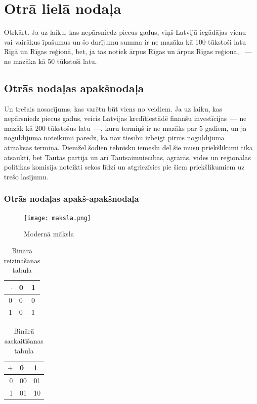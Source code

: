 \documentclass{LU-nosleguma}
\begin{document}
\section{Otrā lielā nodaļa}
Otrkārt. Ja uz laiku, kas nepārsniedz piecus gadus, viņš Latvijā iegādājas vienu vai vairākus īpašumus un šo darījumu
summa ir ne mazāka kā 100 tūkstoši latu Rīgā un Rīgas reģionā, bet, ja tas notiek ārpus Rīgas un ārpus Rīgas reģiona,
~--- ne mazāka kā 50 tūkstoši latu.

\subsection{Otrās nodaļas apakšnodaļa}
Un trešais nosacījums, kas varētu būt viens no veidiem. Ja uz laiku, kas nepārsniedz piecus gadus, veicis Latvijas 
kredītiestādē finanšu investīcijas~--- ne mazāk kā 200 tūkstošus latu~---, kuru termiņš ir ne mazāks par 5 gadiem, 
un ja noguldījuma noteikumi paredz, ka nav tiesību izbeigt pirms noguldījuma atmaksas termiņa.
Diemžēl šodien tehnisku iemeslu dēļ šie mūsu priekšlikumi tika atsaukti, bet Tautas partija un arī Tautsaimniecības, 
agrārās, vides un reģionālās politikas komisija noteikti sekos līdzi un atgriezīsies pie šiem priekšlikumiem uz trešo 
lasījumu.

\subsubsection{Otrās nodaļas apakš-apakšnodaļa}

\begin{figure}[!htbp]
	\texttt{[image: maksla.png]}
	\caption{Modernā māksla}
\end{figure}

\begin{table}[!htbp]
	\caption{Binārā reizināšanas tabula}
	\begin{tabular}{r | l | l |}
		$\cdot$  & 0 & 1\\ \hline
		0 & 0 & 0\\ \hline
		1 & 0 & 1\\ \hline
	\end{tabular}
\end{table}

\begin{table}[!htbp]
	\caption{Binārā saskaitīšanas tabula}
	\begin{tabular}{r | l | l |}
		$+$  & 0 & 1\\ \hline
		0 & 00 & 01\\ \hline
		1 & 01 & 10\\ \hline
	\end{tabular}
\end{table}
\end{document}
